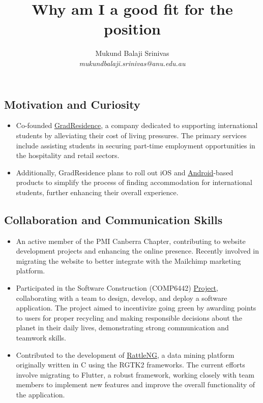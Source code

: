 \documentclass{article}
\title{Why am I a good fit for the position}
\author{Mukund Balaji Srinivas\\\textit{mukundbalaji.srinivas@anu.edu.au}}
\begin{document}
\maketitle

\sectionfont{\small}
\subsectionfont{\small}

\subsection*{Motivation and Curiosity}
\begin{itemize}
    \item {Co-founded \href{https://gradresidence.com/}{GradResidence}, a company dedicated to supporting international students by alleviating their cost of living pressures. The primary services include assisting students in securing part-time employment opportunities in the hospitality and retail sectors.}
    \item {Additionally, GradResidence plans to roll out iOS and \href{https://github.com/gradresidence/android}{Android}-based products to simplify the process of finding accommodation for international students, further enhancing their overall experience.} 
    
\end{itemize}

\subsection*{Collaboration and Communication Skills}
\begin{itemize}
    \item An active member of the PMI Canberra Chapter, contributing to website development projects and enhancing the online presence. Recently involved in migrating the website to better integrate with the Mailchimp marketing platform.
    \item Participated in the Software Construction (COMP6442) \href{https://gitlab.cecs.anu.edu.au/u7544253/ga-23s1-comp2100-6442} {Project}, collaborating with a team to design, develop, and deploy a software application. The project aimed to incentivize going green by awarding points to users for proper recycling and making responsible decisions about the planet in their daily lives, demonstrating strong communication and teamwork skills.
    \item Contributed to the development of \href{https://github.com/gjwgit/rattleng}{RattleNG}, a data mining platform originally written in C using the RGTK2 frameworks. The current efforts involve migrating to Flutter, a robust framework, working closely with team members to implement new features and improve the overall functionality of the application.
\end{itemize}
\end{document}

